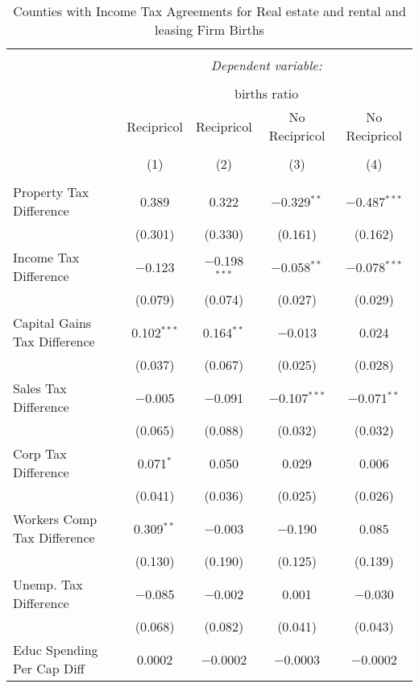 
\begin{table}[!htbp] \centering 
  \caption{Counties with Income Tax Agreements for  Real estate and rental and leasing Firm Births} 
  \label{53agreement} 
\begin{tabular}{@{\extracolsep{5pt}}lcccc} 
\\[-1.8ex]\hline 
\hline \\[-1.8ex] 
 & \multicolumn{4}{c}{\textit{Dependent variable:}} \\ 
\cline{2-5} 
\\[-1.8ex] & \multicolumn{4}{c}{births ratio} \\ 
 & Recipricol & Recipricol & No Recipricol & No Recipricol \\ 
\\[-1.8ex] & (1) & (2) & (3) & (4)\\ 
\hline \\[-1.8ex] 
 Property Tax Difference & 0.389 & 0.322 & $-$0.329$^{**}$ & $-$0.487$^{***}$ \\ 
  & (0.301) & (0.330) & (0.161) & (0.162) \\ 
  Income Tax Difference & $-$0.123 & $-$0.198$^{***}$ & $-$0.058$^{**}$ & $-$0.078$^{***}$ \\ 
  & (0.079) & (0.074) & (0.027) & (0.029) \\ 
  Capital Gains Tax Difference & 0.102$^{***}$ & 0.164$^{**}$ & $-$0.013 & 0.024 \\ 
  & (0.037) & (0.067) & (0.025) & (0.028) \\ 
  Sales Tax Difference & $-$0.005 & $-$0.091 & $-$0.107$^{***}$ & $-$0.071$^{**}$ \\ 
  & (0.065) & (0.088) & (0.032) & (0.032) \\ 
  Corp Tax Difference & 0.071$^{*}$ & 0.050 & 0.029 & 0.006 \\ 
  & (0.041) & (0.036) & (0.025) & (0.026) \\ 
  Workers Comp Tax Difference & 0.309$^{**}$ & $-$0.003 & $-$0.190 & 0.085 \\ 
  & (0.130) & (0.190) & (0.125) & (0.139) \\ 
  Unemp. Tax Difference & $-$0.085 & $-$0.002 & 0.001 & $-$0.030 \\ 
  & (0.068) & (0.082) & (0.041) & (0.043) \\ 
  Educ Spending Per Cap Diff & 0.0002 & $-$0.0002 & $-$0.0003 & $-$0.0002 \\ 

\end{tabular}
\end{table}
